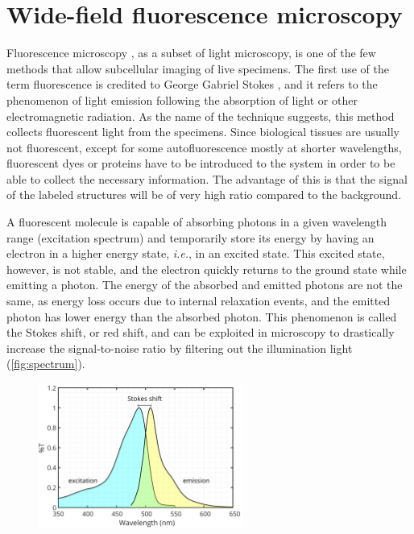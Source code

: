 \section{Wide-field fluorescence microscopy}

Fluorescence microscopy \cite{lichtman_fluorescence_2005,diaspro_optical_2011}, as a subset of light microscopy, is one of the few methods that allow subcellular imaging of live specimens. The first use of the term fluorescence is credited to  George Gabriel Stokes \cite{stokes_change_1852}, and it refers to the phenomenon of light emission following the absorption of light or other electromagnetic radiation. As the name of the technique suggests, this method collects fluorescent light from the specimens.
Since biological tissues are usually not fluorescent, except for some autofluorescence mostly at shorter wavelengths, fluorescent dyes or proteins have to be introduced to the system in order to be able to collect the necessary information. The advantage of this is that the signal of the labeled structures will be of very high ratio compared to the background.

A fluorescent molecule is capable of absorbing photons in a given wavelength range (excitation spectrum) and temporarily store its energy by having an electron in a higher energy state, \textit{i.e.}, in an excited state. This excited state, however, is not stable, and the electron quickly returns to the ground state while emitting a photon. The energy of the absorbed and emitted photons are not the same, as energy loss occurs due to internal relaxation events, and the emitted photon has lower energy than the absorbed photon. This phenomenon is called the Stokes shift, or red shift, and can be exploited in microscopy to drastically increase the signal-to-noise ratio by filtering out the illumination light (\autoref{fig:spectrum}).

  \begin{figure}
    \centering
    \includegraphics[width=0.6\textwidth]{spectrum/egfp}
    \label{fig:spectrum}
  \end{figure}

